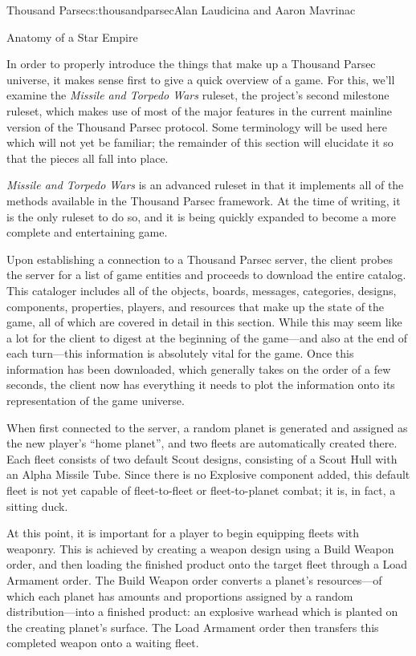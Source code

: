 \begin{aosachapter}{Thousand Parsec}{s:thousandparsec}{Alan Laudicina and Aaron Mavrinac}
\begin{aosasect1}{Anatomy of a Star Empire}

In order to properly introduce the things that make up a Thousand
Parsec universe, it makes sense first to give a quick overview of a
game. For this, we'll examine the \emph{Missile and Torpedo Wars}
ruleset, the project's second milestone ruleset, which makes use of
most of the major features in the current mainline version of the
Thousand Parsec protocol. Some terminology will be used here which
will not yet be familiar; the remainder of this section will elucidate
it so that the pieces all fall into place.

\emph{Missile and Torpedo Wars} is an advanced ruleset in that it
implements all of the methods available in the Thousand Parsec
framework. At the time of writing, it is the only ruleset to do so,
and it is being quickly expanded to become a more complete and
entertaining game.

Upon establishing a connection to a Thousand Parsec server, the client
probes the server for a list of game entities and proceeds to download
the entire catalog.  This cataloger includes all of the objects,
boards, messages, categories, designs, components, properties, players,
and resources that make up the state of the game, all of which are
covered in detail in this section. While this may seem like a lot for
the client to digest at the beginning of the game---and also at the
end of each turn---this information is absolutely vital for the
game. Once this information has been downloaded, which generally takes on the order of a few seconds, the client now has
everything it needs to plot the information onto its representation of
the game universe.

When first connected to the server, a random planet is generated and
assigned as the new player's ``home planet'', and two fleets are
automatically created there. Each fleet consists of two default Scout
designs, consisting of a Scout Hull with an Alpha Missile Tube.  Since
there is no Explosive component added, this default fleet is not yet
capable of fleet-to-fleet or fleet-to-planet combat; it is, in fact, a
sitting duck.

\pagebreak

At this point, it is important for a player to begin equipping fleets
with weaponry. This is achieved by creating a weapon design using a
Build Weapon order, and then loading the finished product onto the
target fleet through a Load Armament order. The Build Weapon order
converts a planet's resources---of which each planet has amounts and
proportions assigned by a random distribution---into a finished
product: an explosive warhead which is planted on the creating
planet's surface. The Load Armament order then transfers this
completed weapon onto a waiting fleet.


\end{aosasect1}
\end{aosachapter}
